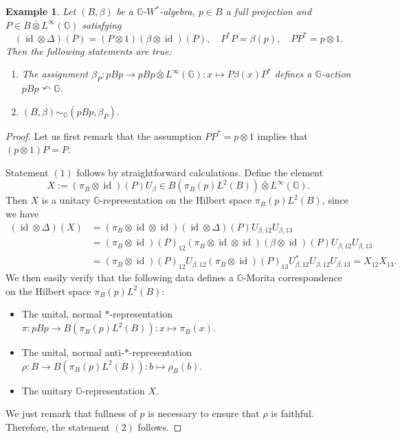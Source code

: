\documentclass[reqno]{amsart}
\numberwithin{equation}{section}
\newtheorem{Exa}[Theorem]{Example}
\DeclareMathOperator{\id}{\mathrm{id}}
\newcommand{\G}{\mathbb{G}}
\newcommand{\ovot}{\bar{\otimes}}
\begin{document}
\begin{Exa}\label{main example}
    Let $(B, \beta)$ be a $\G$-$W^*$-algebra, $p\in B$ a full projection and $P\in B \ovot L^\infty(\G)$ satisfying
    $$(\id \otimes \Delta)(P) = (P\otimes 1) (\beta \otimes \id)(P), \quad P^*P=\beta(p), \quad PP^* = p\otimes 1.$$
    Then the following statements are true:
    \begin{enumerate}\setlength\itemsep{-0.5em}
        \item The assignment  $\beta_P: pBp \to pBp\ovot L^\infty(\G): x \mapsto P\beta(x)P^*$
    defines a $\G$-action $pBp \curvearrowleft \G$. 
    \item $(B, \beta)\sim_\G (pBp, \beta_P).$
    \end{enumerate}
\end{Exa}
\begin{proof} Let us first remark that the assumption $PP^*= p\otimes 1$ implies that $(p\otimes 1)P= P$.

Statement $(1)$ follows by straightforward calculations. Define the element $$X:= (\pi_B\otimes \id)(P) U_\beta \in B(\pi_B(p)L^2(B))\ovot L^\infty(\G).$$ Then $X$ is a unitary $\G$-representation on the Hilbert space $\pi_B(p)L^2(B)$, since we have
\begin{align*}
    (\id \otimes \Delta)(X)&= (\pi_B\otimes \id\otimes \id)(\id \otimes \Delta)(P) U_{\beta, 12}U_{\beta, 13}\\
    &= (\pi_B\otimes \id)(P)_{12} (\pi_B\otimes \id \otimes \id)(\beta \otimes \id)(P) U_{\beta,12} U_{\beta, 13}\\
    &= (\pi_B\otimes \id)(P)_{12} U_{\beta, 12}(\pi_B\otimes \id)(P)_{13}U_{\beta, 12}^* U_{\beta,12}U_{\beta, 13}= X_{12} X_{13}.
\end{align*}
We then easily verify that the following data defines a $\G$-Morita correspondence on the Hilbert space $\pi_B(p)L^2(B)$:
\begin{itemize}\setlength\itemsep{-0.5em}
    \item The unital, normal $*$-representation $\pi: pBp\to B(\pi_B(p)L^2(B)): x \mapsto \pi_B(x)$.
    \item The unital, normal anti-$*$-representation $\rho: B\to B(\pi_B(p)L^2(B)): b \mapsto \rho_B(b)$.
    \item The unitary $\G$-representation $X$.
\end{itemize}
We just remark that fullness of $p$ is necessary to ensure that $\rho$ is faithful. Therefore, the statement $(2)$ follows.
\end{proof}
\end{document}
